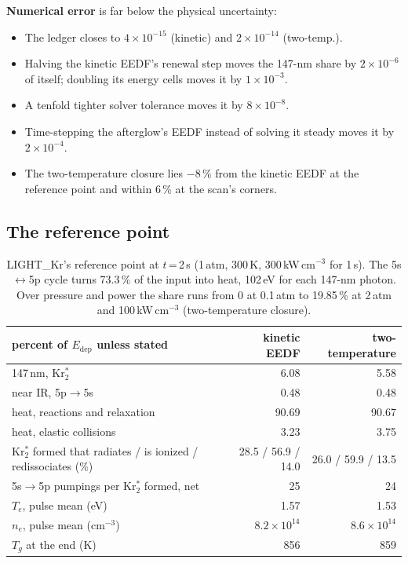 \documentclass[11pt]{article}
\newcommand{\Krts}{Kr\ensuremath{_2^*}}
\newcommand{\Edep}{\ensuremath{E_\mathrm{dep}}}
\begin{document}
\textbf{Numerical error} is far below the physical uncertainty:
\begin{itemize}
\item The ledger closes to $4\times10^{-15}$ (kinetic) and $2\times10^{-14}$
  (two-temp.).
\item Halving the kinetic EEDF's renewal step moves the 147-nm share by
  $2\times10^{-6}$ of itself; doubling its energy cells moves it by
  $1\times10^{-3}$.
\item A tenfold tighter solver tolerance moves it by $8\times10^{-8}$.
\item Time-stepping the afterglow's EEDF instead of solving it steady moves
  it by $2\times10^{-4}$.
\item The two-temperature closure lies $-8$\,\% from the kinetic EEDF at
  the reference point and within 6\,\% at the scan's corners.
\end{itemize}

\subsection{The reference point}

\begin{table}[H]
\small\centering
\begin{tabular}{@{}lrr@{}}
\toprule
percent of \Edep{} unless stated & kinetic EEDF & two-temperature \\
\midrule
147\,nm, \Krts{} & 6.08 & 5.58 \\
near IR, 5p$\to$5s & 0.48 & 0.48 \\
heat, reactions and relaxation & 90.69 & 90.67 \\
heat, elastic collisions & 3.23 & 3.75 \\
\Krts{} formed that radiates / is ionized / redissociates (\%) & 28.5 / 56.9 / 14.0 & 26.0 / 59.9 / 13.5 \\
5s$\to$5p pumpings per \Krts{} formed, net & 25 & 24 \\
$T_e$, pulse mean (eV) & 1.57 & 1.53 \\
$n_e$, pulse mean (cm$^{-3}$) & $8.2\times10^{14}$ & $8.6\times10^{14}$ \\
$T_g$ at the end (K) & 856 & 859 \\
\bottomrule
\end{tabular}
\caption{LIGHT\_Kr's reference point at $t$\,=\,2\,\textmu s (1\,atm, 300\,K,
300\,kW\,cm$^{-3}$ for 1\,\textmu s). The 5s$\leftrightarrow$5p cycle turns
73.3\,\% of the input into heat, 102\,eV for each 147-nm photon. Over
pressure and power the share runs from 0 at 0.1\,atm to 19.85\,\% at 2\,atm
and 100\,kW\,cm$^{-3}$ (two-temperature closure).}
\end{table}
\end{document}
